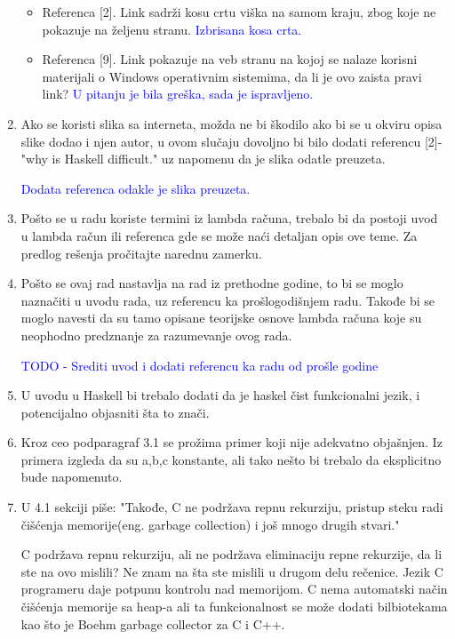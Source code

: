 \documentclass[a4paper]{report}
\newcommand{\odgovor}[1]{\textcolor{blue}{#1}}
\begin{document}
\begin{enumerate}
\begin{itemize}
			\item Referenca [2]. Link sadrži kosu crtu viška na samom kraju, zbog koje ne pokazuje na željenu stranu.
			\odgovor{Izbrisana kosa crta.}
			
			\item Referenca [9]. Link pokazuje na veb stranu na kojoj se nalaze korisni materijali o Windows operativnim sistemima, da li je ovo zaista pravi link?
			\odgovor{U pitanju je bila greška, sada je ispravljeno.}
			
		\end{itemize}
		\item Ako se koristi slika sa interneta, možda ne bi škodilo ako bi se u okviru opisa slike dodao i njen autor, u ovom slučaju dovoljno bi bilo dodati referencu [2]-"why is Haskell difficult." uz napomenu da je slika odatle preuzeta.
		
		\odgovor{Dodata referenca odakle je slika preuzeta.}
		
		\item Pošto se u radu koriste termini iz lambda računa, trebalo bi da postoji uvod u lambda račun ili referenca gde se može naći detaljan opis ove teme. Za predlog rešenja pročitajte narednu zamerku.
		
		\item Pošto se ovaj rad nastavlja na rad iz prethodne godine, to bi se moglo naznačiti u uvodu rada, uz referencu ka prošlogodišnjem radu. Takođe bi se moglo navesti da su tamo opisane teorijske osnove lambda računa koje su neophodno predznanje za razumevanje ovog rada.
		
		\odgovor{TODO - Srediti uvod i dodati referencu ka radu od prošle godine}
		
		\item U uvodu u Haskell bi trebalo dodati da je haskel čist funkcionalni jezik, i potencijalno objasniti šta to znači.
		
		\item Kroz ceo podparagraf 3.1 se prožima primer koji nije adekvatno objašnjen. Iz primera izgleda da su a,b,c konstante, ali tako nešto bi trebalo da eksplicitno bude napomenuto.
		
		\item U 4.1 sekciji piše:
		"Takođe, C ne podržava repnu rekurziju, pristup steku radi čišćenja memorije(eng. garbage collection) i još mnogo drugih stvari."
		
		C podržava repnu rekurziju, ali ne podržava eliminaciju repne rekurzije, da li ste na ovo mislili? Ne znam na šta ste mislili u drugom delu rečenice. Jezik C programeru daje potpunu kontrolu nad memorijom. C nema automatski način čišćenja memorije sa heap-a ali ta funkcionalnost se može dodati bilbiotekama kao što je Boehm garbage collector za C i C++.
		
		
	\end{enumerate}
	
\end{document}
